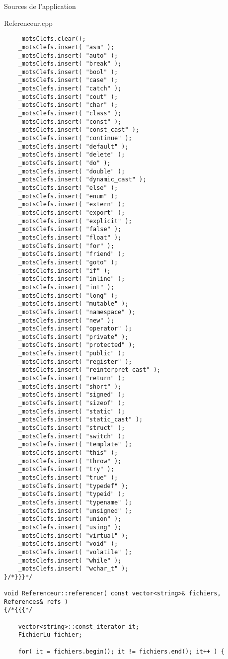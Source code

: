 \documentclass{article}
\begin{document}
\begin{section}{Sources de l'application}
\begin{paragraph}{Referenceur.cpp}
\begin{verbatim}
    _motsClefs.clear();
    _motsClefs.insert( "asm" );
    _motsClefs.insert( "auto" );
    _motsClefs.insert( "break" );
    _motsClefs.insert( "bool" );
    _motsClefs.insert( "case" );
    _motsClefs.insert( "catch" );
    _motsClefs.insert( "cout" );
    _motsClefs.insert( "char" );
    _motsClefs.insert( "class" );
    _motsClefs.insert( "const" );
    _motsClefs.insert( "const_cast" );
    _motsClefs.insert( "continue" );
    _motsClefs.insert( "default" );
    _motsClefs.insert( "delete" );
    _motsClefs.insert( "do" );
    _motsClefs.insert( "double" );
    _motsClefs.insert( "dynamic_cast" );
    _motsClefs.insert( "else" );
    _motsClefs.insert( "enum" );
    _motsClefs.insert( "extern" );
    _motsClefs.insert( "export" );
    _motsClefs.insert( "explicit" );
    _motsClefs.insert( "false" );
    _motsClefs.insert( "float" );
    _motsClefs.insert( "for" );
    _motsClefs.insert( "friend" );
    _motsClefs.insert( "goto" );
    _motsClefs.insert( "if" );
    _motsClefs.insert( "inline" );
    _motsClefs.insert( "int" );
    _motsClefs.insert( "long" );
    _motsClefs.insert( "mutable" );
    _motsClefs.insert( "namespace" );
    _motsClefs.insert( "new" );
    _motsClefs.insert( "operator" );
    _motsClefs.insert( "private" );
    _motsClefs.insert( "protected" );
    _motsClefs.insert( "public" );
    _motsClefs.insert( "register" );
    _motsClefs.insert( "reinterpret_cast" );
    _motsClefs.insert( "return" );
    _motsClefs.insert( "short" );
    _motsClefs.insert( "signed" );
    _motsClefs.insert( "sizeof" );
    _motsClefs.insert( "static" );
    _motsClefs.insert( "static_cast" );
    _motsClefs.insert( "struct" );
    _motsClefs.insert( "switch" );
    _motsClefs.insert( "template" );
    _motsClefs.insert( "this" );
    _motsClefs.insert( "throw" );
    _motsClefs.insert( "try" );
    _motsClefs.insert( "true" );
    _motsClefs.insert( "typedef" );
    _motsClefs.insert( "typeid" );
    _motsClefs.insert( "typename" );
    _motsClefs.insert( "unsigned" );
    _motsClefs.insert( "union" );
    _motsClefs.insert( "using" );
    _motsClefs.insert( "virtual" );
    _motsClefs.insert( "void" );
    _motsClefs.insert( "volatile" );
    _motsClefs.insert( "while" );
    _motsClefs.insert( "wchar_t" );
}/*}}}*/

void Referenceur::referencer( const vector<string>& fichiers, References& refs )
{/*{{{*/

    vector<string>::const_iterator it;
    FichierLu fichier;

    for( it = fichiers.begin(); it != fichiers.end(); it++ ) {


\end{verbatim}
\end{paragraph}
\end{section}
\end{document}
